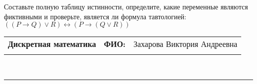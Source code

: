 \documentclass[10pt]{exam}
\newcommand{\class}{Дискретная математика}
\newcommand{\examdate}{}
\begin{document}
\begin{questions}
\begin{enumerate}[a)]
\end{enumerate}\question Составьте полную таблицу истинности, определите, какие переменные являются фиктивными и проверьте, является ли формула тавтологией:
$((P \rightarrow Q) \lor R) \leftrightarrow (P \rightarrow (Q \lor R))$

\end{questions}
\newpage
\begin{flushright}
\begin{tabular}{p{2.8in} r l}
\textbf{\class} & \textbf{ФИО:} &Захарова Виктория Андреевна
\\

\textbf{\examdate} &&\\
\end{tabular}\\
\end{flushright}
\rule[1ex]{\textwidth}{.1pt}
\end{document}
